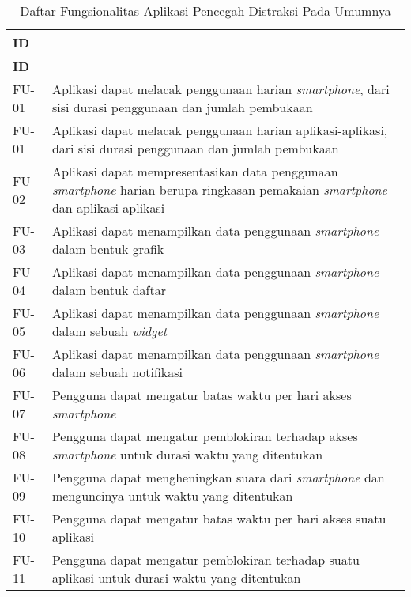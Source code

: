\RaggedLeft
\begin{small}
\begin{longtable}[c]{|W{c}{0.08\textwidth}|>{\ccnormspacing}m{0.82\textwidth}|}
  \caption{Daftar Fungsionalitas Aplikasi Pencegah Distraksi Pada Umumnya}
  \label{tab:daftar_fungsionalitas_app_umum} \\
  \hline {} \textbf{ID} &  \\ \hline \endfirsthead
  \hline {} \textbf{ID} &  \\ \hline \endhead
  
  \hline \endfoot
  
  FU-01  &  Aplikasi dapat melacak penggunaan harian \textit{smartphone}, dari sisi durasi penggunaan dan jumlah pembukaan \\ \hline
  FU-01  &  Aplikasi dapat melacak penggunaan harian aplikasi-aplikasi, dari sisi durasi penggunaan dan jumlah pembukaan \\ \hline
  FU-02  &  Aplikasi dapat mempresentasikan data penggunaan \textit{smartphone} harian berupa ringkasan pemakaian \textit{smartphone} dan aplikasi-aplikasi \\ \hline
  FU-03  &  Aplikasi dapat menampilkan data penggunaan \textit{smartphone} dalam bentuk grafik \\ \hline
  FU-04  &  Aplikasi dapat menampilkan data penggunaan \textit{smartphone} dalam bentuk daftar \\ \hline
  FU-05  &  Aplikasi dapat menampilkan data penggunaan \textit{smartphone} dalam sebuah \textit{widget} \\ \hline
  FU-06  &  Aplikasi dapat menampilkan data penggunaan \textit{smartphone} dalam sebuah notifikasi \\ \hline
  FU-07  &  Pengguna dapat mengatur batas waktu per hari akses \textit{smartphone} \\ \hline
  FU-08  &  Pengguna dapat mengatur pemblokiran terhadap akses \textit{smartphone} untuk durasi waktu yang ditentukan \\ \hline
  FU-09  &  Pengguna dapat mengheningkan suara dari \textit{smartphone} dan menguncinya untuk waktu yang ditentukan \\ \hline
  FU-10  &  Pengguna dapat mengatur batas waktu per hari akses suatu aplikasi \\ \hline
  FU-11  &  Pengguna dapat mengatur pemblokiran terhadap suatu aplikasi untuk durasi waktu yang ditentukan \\ \hline

\end{longtable}
\end{small}
